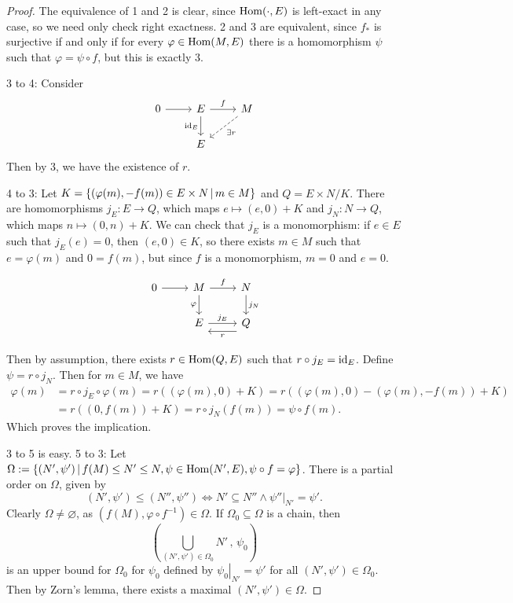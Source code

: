 \begin{proof}
  The equivalence of 1 and 2 is clear, since $\operatorname{Hom}(\cdot, E)$ is left-exact in
  any case, so we need only check right exactness.
  2 and 3 are equivalent, since $f_*$ is surjective if and only if for every
  $\varphi \in \operatorname{Hom}(M, E)$ there is a homomorphism $\psi$ such that $\varphi =
  \psi \circ f$, but this is exactly 3.

  3 to 4:
  Consider
  \[\begin{tikzcd}
	  0 & E & M \\
	  & E
	  \arrow[from=1-1, to=1-2]
	  \arrow["f", from=1-2, to=1-3]
	  \arrow["{\id_E}"', from=1-2, to=2-2]
	  \arrow["{\exists r}", dashed, from=1-3, to=2-2]
	\end{tikzcd}\]
  Then by 3, we have the existence of $r$.

  4 to 3:
  Let $K = \{ (\varphi(m), -f(m)) \in E \times N \,|\, m \in M \}$ and $Q = E
  \times N / K$.
  There are homomorphisms $j_E: E \to Q$, which maps $e \mapsto (e, 0) + K$ and
  $j_N: N \to Q$, which maps $n \mapsto (0,n) + K$.
  We can check that $j_E$ is a monomorphism: if $e \in E$ such that $j_E(e) =
  0$, then $(e,0) \in K$, so there exists $m \in M$ such that $e = \varphi(m)$
  and $0 = f(m)$, but since $f$ is a monomorphism, $m = 0$ and $e = 0$.

  \[\begin{tikzcd}
	  0 & M & N \\
	  & E & Q
	  \arrow[from=1-1, to=1-2]
	  \arrow["f", from=1-2, to=1-3]
	  \arrow["\varphi"', from=1-2, to=2-2]
	  \arrow["{j_N}", from=1-3, to=2-3]
	  \arrow["{j_E}", from=2-2, to=2-3]
	  \arrow["r", shift left=3, from=2-3, to=2-2]
	\end{tikzcd}\]

  Then by assumption, there exists $r \in \operatorname{Hom}(Q,E)$ such that $r \circ j_E =
  \operatorname{id}_E$.
  Define $\psi = r \circ j_N$.
  Then for $m \in M$, we have
  \begin{align*}
	\varphi(m)
	&= r \circ j_E \circ \varphi(m)
	= r((\varphi(m), 0) + K)
	= r( (\varphi(m), 0) - (\varphi(m), -f(m)) + K ) \\
	&= r((0, f(m)) + K)
	= r \circ j_N(f(m))
	= \psi \circ f(m).
  \end{align*}
  Which proves the implication.

  3 to 5 is easy.
  5 to 3:
  Let $\Omega := \{ (N', \psi') \,|\, f(M) \le N' \le N, \psi \in \operatorname{Hom}(N', E),
  \psi \circ f = \varphi \}$.
  There is a partial order on $\Omega$, given by
  \[
	(N', \psi') \le (N'', \psi'') \iff N' \subseteq N'' \land \left. \psi''
	\right|_{N'} = \psi'.
  \]
  Clearly $\Omega \ne \varnothing$, as $(f(M), \varphi \circ f^{-1}) \in
  \Omega$.
  If $\Omega_0 \subseteq \Omega$ is a chain, then
  \[
	\left( \bigcup_{(N', \psi') \in \Omega_0}\!\!N'\,,\,\psi_0 \right)
  \]
  is an upper bound for $\Omega_0$ for $\psi_0$ defined by $\left. \psi_0
  \right|_{N'} = \psi'$ for all $(N', \psi') \in \Omega_0$.
  Then by Zorn's lemma, there exists a maximal $(N', \psi') \in \Omega$.


\end{proof}
